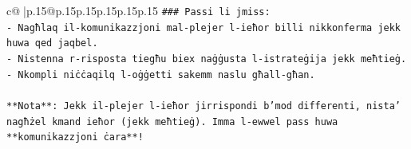 \documentclass{article}
\begin{document}
{\begin{supertabular}{c@{$\;$}|p{.15\linewidth}@{}p{.15\linewidth}p{.15\linewidth}p{.15\linewidth}p{.15\linewidth}p{.15\linewidth}}
{{{\texttt{\#\#\# Passi li jmiss:} \\
\texttt{{-} Nagħlaq il{-}komunikazzjoni mal{-}plejer l{-}ieħor billi nikkonferma jekk huwa qed jaqbel.} \\
\texttt{{-} Nistenna r{-}risposta tiegħu biex naġġusta l{-}istrateġija jekk meħtieġ.} \\
\texttt{{-} Nkompli niċċaqilq l{-}oġġetti sakemm naslu għall{-}għan.} \\
\\ 
\texttt{**Nota**: Jekk il{-}plejer l{-}ieħor jirrispondi b'mod differenti, nista' nagħżel kmand ieħor (jekk meħtieġ). Imma l{-}ewwel pass huwa **komunikazzjoni ċara**!} \\
            }
        }
    }
     \\ \\


\end{supertabular}}
\end{document}
